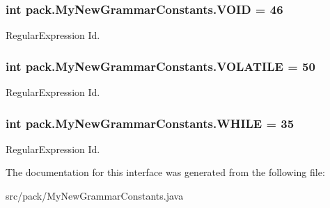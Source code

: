 \subsubsection[{\texorpdfstring{V\+O\+ID}{VOID}}]{\setlength{\rightskip}{0pt plus 5cm}int pack.\+My\+New\+Grammar\+Constants.\+V\+O\+ID = 46}\hypertarget{interfacepack_1_1_my_new_grammar_constants_a63a4f3fdf0e69ecb104c12d35c2df23d}{}\label{interfacepack_1_1_my_new_grammar_constants_a63a4f3fdf0e69ecb104c12d35c2df23d}
Regular\+Expression Id. 
\subsubsection[{\texorpdfstring{V\+O\+L\+A\+T\+I\+LE}{VOLATILE}}]{\setlength{\rightskip}{0pt plus 5cm}int pack.\+My\+New\+Grammar\+Constants.\+V\+O\+L\+A\+T\+I\+LE = 50}\hypertarget{interfacepack_1_1_my_new_grammar_constants_a719fdcf8f9cbad0ee622100b479e25e4}{}\label{interfacepack_1_1_my_new_grammar_constants_a719fdcf8f9cbad0ee622100b479e25e4}
Regular\+Expression Id. 
\subsubsection[{\texorpdfstring{W\+H\+I\+LE}{WHILE}}]{\setlength{\rightskip}{0pt plus 5cm}int pack.\+My\+New\+Grammar\+Constants.\+W\+H\+I\+LE = 35}\hypertarget{interfacepack_1_1_my_new_grammar_constants_a1d787be3856e916b2d261ce46a958b71}{}\label{interfacepack_1_1_my_new_grammar_constants_a1d787be3856e916b2d261ce46a958b71}
Regular\+Expression Id. 

The documentation for this interface was generated from the following file\+:\begin{DoxyCompactItemize}
\item 
src/pack/My\+New\+Grammar\+Constants.\+java\end{DoxyCompactItemize}
